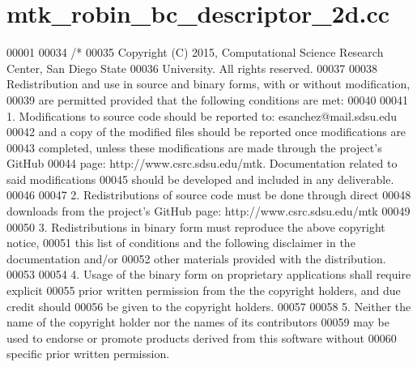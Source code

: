 \hypertarget{mtk__robin__bc__descriptor__2d_8cc_source}{\section{mtk\+\_\+robin\+\_\+bc\+\_\+descriptor\+\_\+2d.\+cc}
\label{mtk__robin__bc__descriptor__2d_8cc_source}
}

\begin{DoxyCode}
00001 
00034 \textcolor{comment}{/*}
00035 \textcolor{comment}{Copyright (C) 2015, Computational Science Research Center, San Diego State}
00036 \textcolor{comment}{University. All rights reserved.}
00037 \textcolor{comment}{}
00038 \textcolor{comment}{Redistribution and use in source and binary forms, with or without modification,}
00039 \textcolor{comment}{are permitted provided that the following conditions are met:}
00040 \textcolor{comment}{}
00041 \textcolor{comment}{1. Modifications to source code should be reported to: esanchez@mail.sdsu.edu}
00042 \textcolor{comment}{and a copy of the modified files should be reported once modifications are}
00043 \textcolor{comment}{completed, unless these modifications are made through the project's GitHub}
00044 \textcolor{comment}{page: http://www.csrc.sdsu.edu/mtk. Documentation related to said modifications}
00045 \textcolor{comment}{should be developed and included in any deliverable.}
00046 \textcolor{comment}{}
00047 \textcolor{comment}{2. Redistributions of source code must be done through direct}
00048 \textcolor{comment}{downloads from the project's GitHub page: http://www.csrc.sdsu.edu/mtk}
00049 \textcolor{comment}{}
00050 \textcolor{comment}{3. Redistributions in binary form must reproduce the above copyright notice,}
00051 \textcolor{comment}{this list of conditions and the following disclaimer in the documentation and/or}
00052 \textcolor{comment}{other materials provided with the distribution.}
00053 \textcolor{comment}{}
00054 \textcolor{comment}{4. Usage of the binary form on proprietary applications shall require explicit}
00055 \textcolor{comment}{prior written permission from the the copyright holders, and due credit should}
00056 \textcolor{comment}{be given to the copyright holders.}
00057 \textcolor{comment}{}
00058 \textcolor{comment}{5. Neither the name of the copyright holder nor the names of its contributors}
00059 \textcolor{comment}{may be used to endorse or promote products derived from this software without}
00060 \textcolor{comment}{specific prior written permission.}

\end{DoxyCode}

